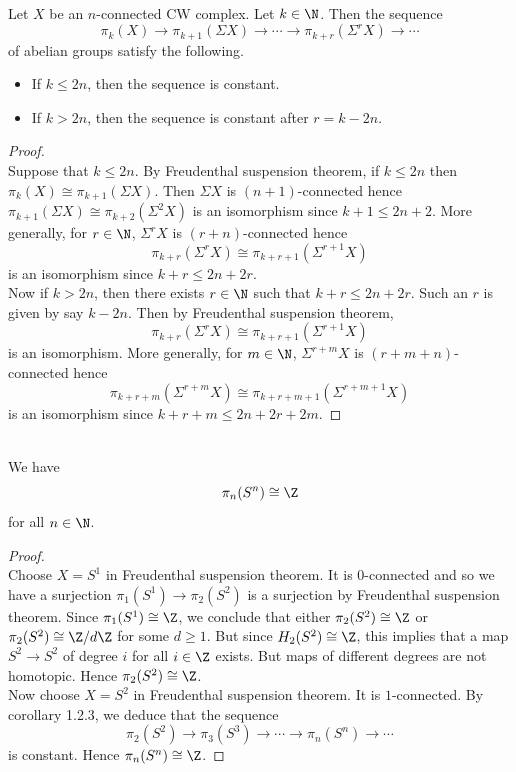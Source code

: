 \documentclass[a4paper]{article}
\begin{document}
\begin{crl}{}{}\\
Let $X$ be an $n$-connected CW complex. Let $k\in\N$. Then the sequence $$\pi_k(X)\to\pi_{k+1}(\Sigma X)\to\cdots\to\pi_{k+r}(\Sigma^r X)\to\cdots$$ of abelian groups satisfy the following. 
\begin{itemize}
\item If $k\leq 2n$, then the sequence is constant. 
\item If $k>2n$, then the sequence is constant after $r=k-2n$. 
\end{itemize}
\begin{proof}\\
Suppose that $k\leq 2n$. By Freudenthal suspension theorem, if $k\leq 2n$ then $\pi_k(X)\cong\pi_{k+1}(\Sigma X)$. Then $\Sigma X$ is $(n+1)$-connected hence $\pi_{k+1}(\Sigma X)\cong\pi_{k+2}(\Sigma^2X)$ is an isomorphism since $k+1\leq 2n+2$. More generally, for $r\in\N$, $\Sigma^rX$ is $(r+n)$-connected hence $$\pi_{k+r}(\Sigma^rX)\cong\pi_{k+r+1}(\Sigma^{r+1}X)$$ is an isomorphism since $k+r\leq 2n+2r$. \\

Now if $k>2n$, then there exists $r\in\N$ such that $k+r\leq 2n+2r$. Such an $r$ is given by say $k-2n$. Then by Freudenthal suspension theorem, $$\pi_{k+r}(\Sigma^rX)\cong\pi_{k+r+1}(\Sigma^{r+1}X)$$ is an isomorphism. More generally, for $m\in\N$, $\Sigma^{r+m}X$ is $(r+m+n)$-connected hence $$\pi_{k+r+m}(\Sigma^{r+m}X)\cong\pi_{k+r+m+1}(\Sigma^{r+m+1}X)$$ is an isomorphism since $k+r+m\leq 2n+2r+2m$. 
\end{proof}
\end{crl}

\begin{crl}{}{}\\
We have $$\pi_n(S^n)\cong\Z$$ for all $n\in\N$. 
\begin{proof}\\
Choose $X=S^1$ in Freudenthal suspension theorem. It is $0$-connected and so we have a surjection $\pi_1(S^1)\to\pi_2(S^2)$ is a surjection by Freudenthal suspension theorem. Since $\pi_1(S^1)\cong\Z$, we conclude that either $\pi_2(S^2)\cong\Z$ or $\pi_2(S^2)\cong\Z/d\Z$ for some $d\geq 1$. But since $H_2(S^2)\cong\Z$, this implies that a map $S^2\to S^2$ of degree $i$ for all $i\in\Z$ exists. But maps of different degrees are not homotopic. Hence $\pi_2(S^2)\cong\Z$. \\

Now choose $X=S^2$ in Freudenthal suspension theorem. It is $1$-connected. By corollary 1.2.3, we deduce that the sequence $$\pi_2(S^2)\to\pi_3(S^3)\to\cdots\to\pi_n(S^n)\to\cdots$$ is constant. Hence $\pi_n(S^n)\cong\Z$. 
\end{proof}
\end{crl}
\end{document}
